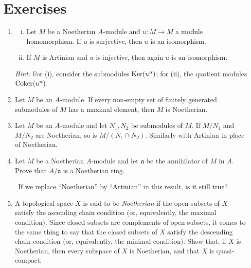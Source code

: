 \section*{Exercises}

\begin{enumerate}
    \item \label{exer1-chapter6}\begin{enumerate}[i)]
        \item Let $M$ be a Noetherian $A$-module and $u \colon M \to M$ a module homomorphism. If $u$ is surjective, then $u$ is an isomorphism.
        \item If $M$ is Artinian and $u$ is injective, then again $u$ is an isomorphism.
    \end{enumerate}
    \textit{Hint:} For (i), consider the submodules $\operatorname{Ker}(u^n)$; for (ii), the quotient modules $\operatorname{Coker}(u^n)$.

    \item \label{exer2-chapter6}Let $M$ be an $A$-module. If every non-empty set of finitely generated submodules of $M$ has a maximal element, then $M$ is Noetherian.

    \item \label{exer3-chapter6}Let $M$ be an $A$-module and let $N_1, N_2$ be submodules of $M$. If $M/N_1$ and $M/N_2$ are Noetherian, so is $M/(N_1 \cap N_2)$. Similarly with Artinian in place of Noetherian.

    \item \label{exer4-chapter6}Let $M$ be a Noetherian $A$-module and let $\mathfrak{a}$ be the annihilator of $M$ in $A$. Prove that $A/\mathfrak{a}$ is a Noetherian ring.
    
    \quad\, If we replace ``Noetherian'' by ``Artinian'' in this result, is it still true?

    \item \label{exer5-chapter6}A topological space $X$ is said to be \emph{Noetherian} if the open subsets of $X$ satisfy the ascending chain condition (or, equivalently, the maximal condition). Since closed subsets are complements of open subsets, it comes to the same thing to say that the closed subsets of $X$ satisfy the descending chain condition (or, equivalently, the minimal condition). Show that, if $X$ is Noetherian, then every subspace of $X$ is Noetherian, and that $X$ is quasi-compact.


\end{enumerate}
